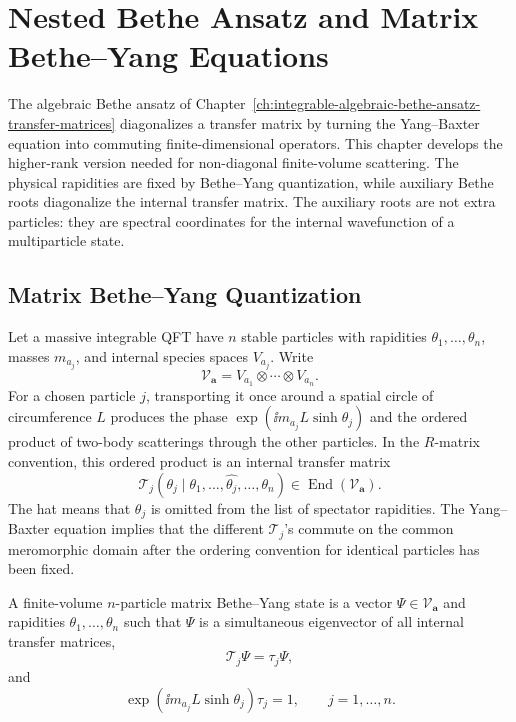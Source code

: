 \chapter{Nested Bethe Ansatz and Matrix Bethe--Yang Equations}
\label{ch:integrable-nested-bethe-ansatz-matrix-bethe-yang}

\ConventionsLorentzian

The algebraic Bethe ansatz of
Chapter~\ref{ch:integrable-algebraic-bethe-ansatz-transfer-matrices}
diagonalizes a transfer matrix by turning the Yang--Baxter equation into
commuting finite-dimensional operators.  This chapter develops the
higher-rank version needed for non-diagonal finite-volume scattering.  The
physical rapidities are fixed by Bethe--Yang quantization, while auxiliary
Bethe roots diagonalize the internal transfer matrix.  The auxiliary roots
are not extra particles: they are spectral coordinates for the internal
wavefunction of a multiparticle state.

\section{Matrix Bethe--Yang Quantization}

Let a massive integrable QFT have \(n\) stable particles with rapidities
\(\theta_1,\ldots,\theta_n\), masses \(m_{a_j}\), and internal species spaces
\(V_{a_j}\).  Write
\[
  \mathcal V_{\boldsymbol a}
  =
  V_{a_1}\otimes\cdots\otimes V_{a_n}.
\]
For a chosen particle \(j\), transporting it once around a spatial circle of
circumference \(L\) produces the phase
\(\exp(\ii m_{a_j}L\sinh\theta_j)\) and the ordered product of two-body
scatterings through the other particles.  In the \(R\)-matrix convention,
this ordered product is an internal transfer matrix
\[
  \mathcal T_j(\theta_j\mid\theta_1,\ldots,\widehat{\theta_j},\ldots,\theta_n)
  \in \operatorname{End}(\mathcal V_{\boldsymbol a}).
\]
The hat means that \(\theta_j\) is omitted from the list of spectator
rapidities.  The Yang--Baxter equation implies that the different
\(\mathcal T_j\)'s commute on the common meromorphic domain after the
ordering convention for identical particles has been fixed.

\begin{definition}
\label{def:matrix-bethe-yang-state}
A finite-volume \(n\)-particle matrix Bethe--Yang state is a vector
\(\Psi\in\mathcal V_{\boldsymbol a}\) and rapidities
\(\theta_1,\ldots,\theta_n\) such that \(\Psi\) is a simultaneous eigenvector
of all internal transfer matrices,
\[
  \mathcal T_j\Psi=\tau_j\Psi ,
\]
and
\begin{equation}
  \exp\!\left(\ii m_{a_j}L\sinh\theta_j\right)\tau_j=1,
  \qquad j=1,\ldots,n .
  \label{eq:matrix-bethe-yang}
\end{equation}
\end{definition}

